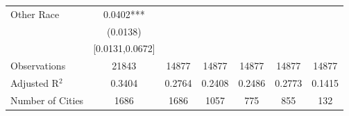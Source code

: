 \documentclass{article}
\begin{document}
\begin{table}[htbp]
\begin{tabular}{l*{6}{c}}
Other Race          &      0.0402***&               &               &               &               &               \\
                    &    (0.0138)   &               &               &               &               &               \\
                    &[0.0131,0.0672]   &               &               &               &               &               \\
\midrule
Observations        &       21843   &       14877   &       14877   &       14877   &       14877   &       14877   \\
Adjusted R$^2$      &      0.3404   &      0.2764   &      0.2408   &      0.2486   &      0.2773   &      0.1415   \\
Number of Cities    &        1686   &        1686   &        1057   &         775   &         855   &         132   \\
\bottomrule
\end{tabular}
\end{table}
\end{document}
